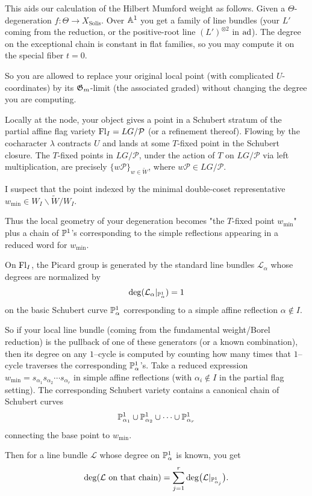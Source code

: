 \documentclass[12pt]{article}
\begin{document}
This aids our calculation of the Hilbert Mumford weight as follows. Given a $\Theta$-degeneration $f:\Theta\to X_{\mathrm{Solis}}$. Over $\A^1$ you get a family of line bundles (your $L'$ coming from the reduction, or the positive-root line $(L')^{\otimes 2}$ in $\ad$). The degree on the exceptional chain is constant in flat families, so you may compute it on the special fiber $t=0$.

So you are allowed to replace your original local point (with complicated $U$-coordinates) by its $\Gm$-limit (the associated graded) without changing the degree you are computing.

Locally at the node, your object gives a point in a Schubert stratum of the partial affine flag variety $\Fl_I = LG/\mathcal{P}$ (or a refinement thereof). Flowing by the cocharacter $\lambda$ contracts $U$ and lands at some $T$-fixed point in the Schubert closure. The $T$-fixed points in $LG/\mathcal{P}$, under the action of $T$ on $LG/\mathcal{P}$ via left multiplication, are precisely $\{w\mathcal{P}\}_{w \in \widetilde{W}}$, where $w\mathcal{P} \in LG/\mathcal{P}$.


I suspect that the point indexed by the minimal double-coset representative
$w_{\min}\in W_I\backslash \widetilde W/W_I$.

Thus the local geometry of your degeneration becomes "the $T$-fixed point $w_{\min}$" plus a chain of $\P^1$'s corresponding to the simple reflections appearing in a reduced word for $w_{\min}$.

On $\Fl_I$, the Picard group is generated by the standard line bundles $\mathcal L_\alpha$ whose degrees are normalized by
\[
\deg(\mathcal L_\alpha|_{\P^1_\alpha})=1
\]
on the basic Schubert curve $\P^1_\alpha$ corresponding to a simple affine reflection $\alpha\notin I$.

So if your local line bundle (coming from the fundamental weight/Borel reduction) is the pullback of one of these generators (or a known combination), then its degree on any $1$–cycle is computed by counting how many times that $1$–cycle traverses the corresponding $\P^1_\alpha$'s. Take a reduced expression
$w_{\min}=s_{\alpha_1}s_{\alpha_2}\cdots s_{\alpha_r}$
in simple affine reflections (with $\alpha_i\notin I$ in the partial flag setting). The corresponding Schubert variety contains a canonical chain of Schubert curves
\[
\P^1_{\alpha_1}\cup \P^1_{\alpha_2}\cup\cdots\cup \P^1_{\alpha_r}
\]
connecting the base point to $w_{\min}$.

Then for a line bundle $\mathcal L$ whose degree on $\P^1_\alpha$ is known, you get
\[
\deg(\mathcal L\text{ on that chain})
=
\sum_{j=1}^r \deg\bigl(\mathcal L|_{\P^1_{\alpha_j}}\bigr).
\]
\end{document}
